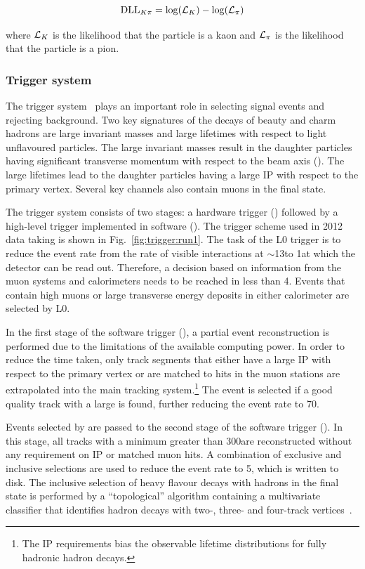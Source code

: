 \begin{equation}
\mathrm{DLL}_{{K}{\pi}} = \log(\mathcal{L}_{{K}}) - \log(\mathcal{L}_{{\pi}})
\end{equation}

\noindent where $\mathcal{L}_{{K}}$ is the likelihood that the particle is a kaon and $\mathcal{L}_{{\pi}}$ is the likelihood that the particle is a pion.
\subsubsection{Trigger system}
\label{detector:trigger}

The \lhcb trigger system~\cite{LHCb-TDR-010,LHCb-DP-2012-004} plays an important role in selecting signal events and rejecting background. Two key signatures of the decays of beauty and charm hadrons are large invariant masses and large lifetimes with respect to light unflavoured particles. The large invariant masses result in the daughter particles having significant transverse momentum with respect to the beam axis (\pt). The large lifetimes lead to the daughter particles having a large IP with respect to the primary vertex. Several key channels also contain muons in the final state.

The trigger system consists of two stages: a hardware trigger (\lone) followed by a high-level trigger implemented in software (\hlt). The trigger scheme used in 2012 data taking is shown in Fig.~\ref{fig:trigger:run1}. The task of the L0 trigger is to reduce the event rate from the rate of visible interactions at $\sim$13\mhz to 1\mhz at which the \lhcb detector can be read out. Therefore, a decision based on information from the muon systems and calorimeters needs to be reached in less than 4\mus. Events that contain high \pt muons or large transverse energy deposits in either calorimeter are selected by L0.

In the first stage of the software trigger (\hltone), a partial event reconstruction is performed due to the limitations of the available computing power. In order to reduce the time taken, only \velo track segments that either have a large IP with respect to the primary vertex or are matched to hits in the muon stations are extrapolated into the main tracking system.{\footnote{The IP requirements bias the observable lifetime distributions for fully hadronic \bquark hadron decays.}} The event is selected if a good quality track with a large \pt is found, further reducing the event rate to 70\khz. 

Events selected by \hltone are passed to the second stage of the software trigger (\hlttwo). In this stage, all tracks with a minimum \pt greater than 300\mevc are reconstructed without any requirement on IP or matched muon hits. A combination of exclusive and inclusive selections are used to reduce the event rate to 5\khz, which is written to disk. The inclusive selection of heavy flavour decays with hadrons in the final state is performed by a ``topological'' algorithm containing a multivariate classifier that identifies \bquark hadron decays with two-, three- and four-track vertices~\cite{trigger-inclusive,trigger-topo}.


